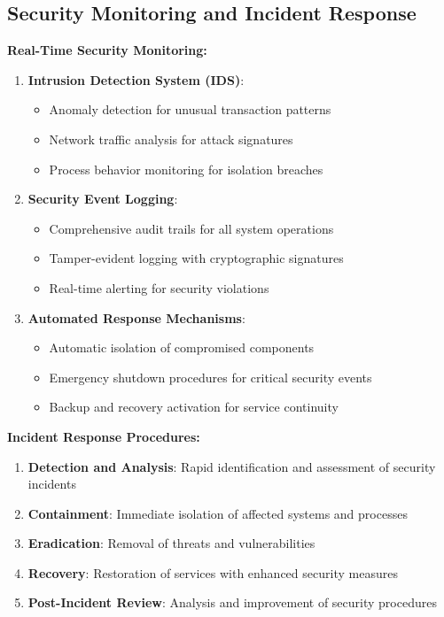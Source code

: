 \documentclass[11pt,a4paper]{article}
\begin{document}
\subsection{Security Monitoring and Incident Response}

\textbf{Real-Time Security Monitoring:}
\begin{enumerate}
    \item \textbf{Intrusion Detection System (IDS)}:
    \begin{itemize}
        \item Anomaly detection for unusual transaction patterns
        \item Network traffic analysis for attack signatures
        \item Process behavior monitoring for isolation breaches
    \end{itemize}
    
    \item \textbf{Security Event Logging}:
    \begin{itemize}
        \item Comprehensive audit trails for all system operations
        \item Tamper-evident logging with cryptographic signatures
        \item Real-time alerting for security violations
    \end{itemize}
    
    \item \textbf{Automated Response Mechanisms}:
    \begin{itemize}
        \item Automatic isolation of compromised components
        \item Emergency shutdown procedures for critical security events
        \item Backup and recovery activation for service continuity
    \end{itemize}
\end{enumerate}

\textbf{Incident Response Procedures:}
\begin{enumerate}
    \item \textbf{Detection and Analysis}: Rapid identification and assessment of security incidents
    \item \textbf{Containment}: Immediate isolation of affected systems and processes
    \item \textbf{Eradication}: Removal of threats and vulnerabilities
    \item \textbf{Recovery}: Restoration of services with enhanced security measures
    \item \textbf{Post-Incident Review}: Analysis and improvement of security procedures
\end{enumerate}
\end{document}
